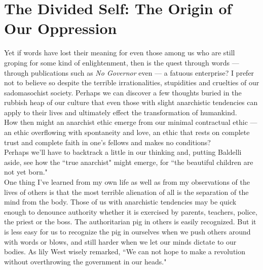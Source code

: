 \section*{The Divided Self: The Origin of Our Oppression}
Yet if words have lost their meaning for even those among us who are still groping for some kind of enlightenment, then is the quest through words --- through publications such as \emph{No Governor} even --- a fatuous enterprise? I prefer not to believe so despite the terrible irrationalities, stupidities and cruelties of our sadomasochist society. Perhaps we can discover a few thoughts buried in the rubbish heap of our culture that even those with slight anarchistic tendencies can apply to their lives and ultimately effect the transformation of humankind.\\
How then might an anarchist ethic emerge from our minimal contractual ethic --- an ethic overflowing with spontaneity and love, an ethic that rests on complete trust and complete faith in one's fellows and makes no conditions?\\
Perhaps we'll have to backtrack a little in our thinking and, putting Baldelli aside, see how the ``true anarchist" might emerge, for ``the beautiful children are not yet born."\\
One thing I've learned from my own life as well as from my observations of the lives of others is that the most terrible alienation of all is the separation of the mind from the body. Those of us with anarchistic tendencies may be quick enough to denounce authority whether it is exercised by parents, teachers, police, the priest or the boss. The authoritarian pig in others is easily recognized. But it is less easy for us to recognize the pig in ourselves when we push others around with words or blows, and still harder when we let our minds dictate to our bodies. As lily West wisely remarked, ``We can not hope to make a revolution without overthrowing the government in our heads."

